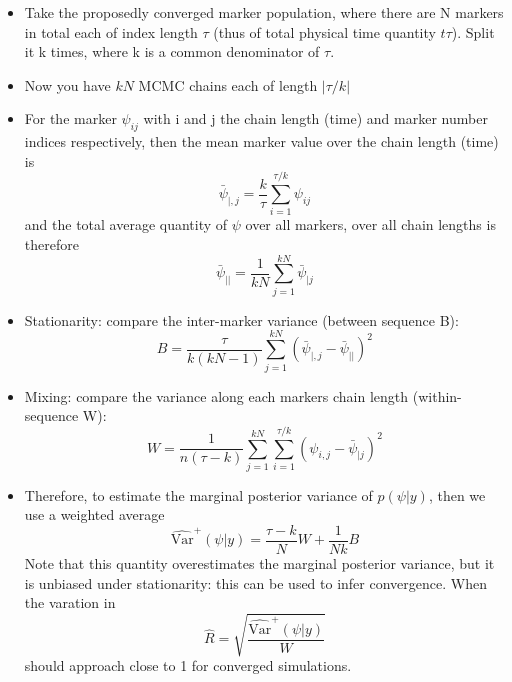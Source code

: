 \documentclass[
]{article}
\begin{document}
\begin{itemize}
\item Take the proposedly converged marker population, where there are N markers in total each of index length $\tau$ (thus of total physical time quantity $t\tau$). Split it k times, where k is a common denominator of $\tau$.
\item Now you have $kN$ MCMC chains each of length $|\tau/k|$
\item For the marker $\psi_{ij}$ with i and j the chain length (time) and marker number indices respectively, then the mean marker value over the chain length (time) is
  \begin{equation}
    \bar{\psi}_{|,j}=\frac{k}{\tau}\sum_{i=1}^{\tau/k}\psi_{ij}
  \end{equation}
  and the total average quantity of $\psi$ over all markers, over all chain lengths is therefore
  \begin{equation}
    \bar{\psi}_{||}=\frac{1}{kN}\sum_{j=1}^{kN}\bar{\psi}_{|j}
  \end{equation}  
\item Stationarity: compare the inter-marker variance (between sequence B):
  \begin{equation}
    B = \frac{\tau}{k(kN-1)}\sum_{j=1}^{kN}(\bar{\psi}_{|,j}-\bar{\psi}_{||})^2
  \end{equation}
\item Mixing: compare the variance along each markers chain length (within-sequence W):
  \begin{equation}
    W = \frac{1}{n(\tau-k)}\sum_{j=1}^{kN}\sum_{i=1}^{\tau/k}(\psi_{i,j}-\bar{\psi}_{|j})^2
  \end{equation}
\item Therefore, to estimate the marginal posterior variance of $p(\psi|y)$, then we use a weighted average
  \begin{equation}
    \hat{\text{Var}}^+(\psi|y)=\frac{\tau-k}{N}W+\frac{1}{Nk}B
  \end{equation}
  Note that this quantity overestimates the marginal posterior variance, but it is unbiased under stationarity: this can be used to infer convergence. When the varation in
  \begin{equation}
    \hat{R}=\sqrt{\frac{\hat{\text{Var}}^+(\psi|y)}{W}}
  \end{equation}
  should approach close to 1 for converged simulations.
\end{itemize}
\end{document}
